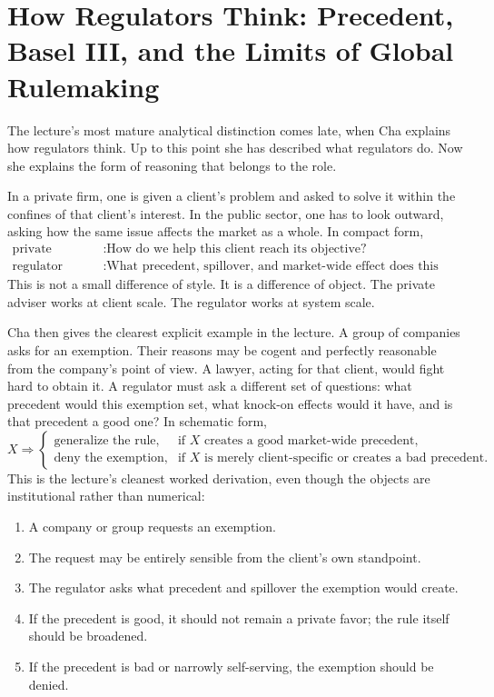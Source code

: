 \section{How Regulators Think: Precedent, Basel III, and the Limits of Global Rulemaking}

The lecture's most mature analytical distinction comes late, when Cha explains how regulators think. Up to this point she has described what regulators do. Now she explains the form of reasoning that belongs to the role.

In a private firm, one is given a client's problem and asked to solve it within the confines of that client's interest. In the public sector, one has to look outward, asking how the same issue affects the market as a whole. In compact form,
\begin{align}
\text{private adviser} &: \text{How do we help this client reach its objective?} \\
\text{regulator} &: \text{What precedent, spillover, and market-wide effect does this create?}
\end{align}
This is not a small difference of style. It is a difference of object. The private adviser works at client scale. The regulator works at system scale.

Cha then gives the clearest explicit example in the lecture. A group of companies asks for an exemption. Their reasons may be cogent and perfectly reasonable from the company's point of view. A lawyer, acting for that client, would fight hard to obtain it. A regulator must ask a different set of questions: what precedent would this exemption set, what knock-on effects would it have, and is that precedent a good one? In schematic form,
\begin{equation}
X \Rightarrow
\begin{cases}
\text{generalize the rule}, & \text{if } X \text{ creates a good market-wide precedent}, \\[4pt]
\text{deny the exemption}, & \text{if } X \text{ is merely client-specific or creates a bad precedent}.
\end{cases}
\end{equation}
This is the lecture's cleanest worked derivation, even though the objects are institutional rather than numerical:
\begin{enumerate}
\item A company or group requests an exemption.
\item The request may be entirely sensible from the client's own standpoint.
\item The regulator asks what precedent and spillover the exemption would create.
\item If the precedent is good, it should not remain a private favor; the rule itself should be broadened.
\item If the precedent is bad or narrowly self-serving, the exemption should be denied.
\end{enumerate}

